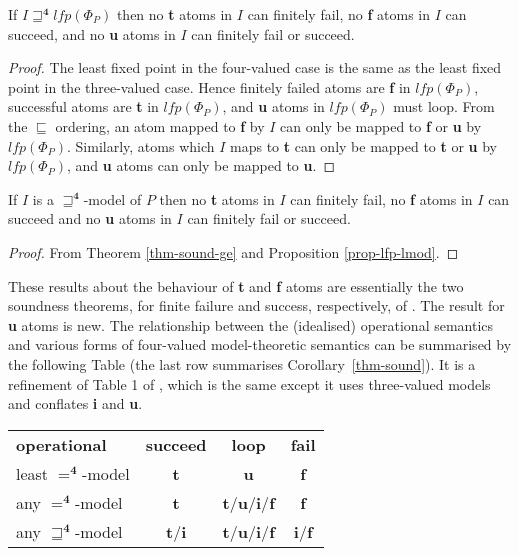 \documentclass{tlp}
\newcommand{\Quad}{\ensuremath{\mathbf{4}}}
\begin{document}
\begin{theorem} \rm
\label{thm-sound-ge}
If $I \sqsupseteq^\Quad lfp(\Phi_P)$ then no \textbf{t} atoms in $I$ can
finitely fail, no \textbf{f} atoms in $I$ can succeed, and no \textbf{u}
atoms in $I$ can finitely fail or succeed.  
\end{theorem}
\begin{proof}
The least fixed point in the four-valued case is the same as
the least fixed point in the three-valued case.
Hence \cite{Kunen87}
finitely failed atoms are \textbf{f} in $lfp(\Phi_P)$, 
successful atoms are \textbf{t} in $lfp(\Phi_P)$,
and \textbf{u} atoms in $lfp(\Phi_P)$ must loop.
From the $\sqsubseteq$ ordering, an atom mapped to \textbf{f} by $I$ 
can only be mapped to \textbf{f} or \textbf{u} by $lfp(\Phi_P)$.
Similarly, atoms which $I$ maps to \textbf{t} can only be 
mapped to \textbf{t} or \textbf{u} by $lfp(\Phi_P)$, and \textbf{u} 
atoms can only be mapped to \textbf{u}.
\end{proof}

\begin{corollary} \rm
\label{thm-sound}
If $I$ is a $\sqsupseteq^\Quad$-model of $P$ then no \textbf{t} atoms in $I$ can
finitely fail, no \textbf{f} atoms in $I$ can succeed and no \textbf{u}
atoms in $I$ can finitely fail or succeed.  
\end{corollary}
\begin{proof}
From Theorem \ref{thm-sound-ge} and Proposition \ref{prop-lfp-lmod}.
\end{proof}
These results about the behaviour of \textbf{t} and \textbf{f} atoms are
essentially the two soundness theorems, for finite failure and success,
respectively, of .  The result for \textbf{u} atoms is new.
The relationship between the (idealised) operational semantics and various
forms of four-valued model-theoretic semantics can be summarised by
the following Table (the last row summarises Corollary~\ref{thm-sound}).
It is a refinement of Table 1 of , which is the same except
it uses three-valued models and conflates \textbf{i} and \textbf{u}.
\medskip

\begin{center}
\begin{tabular}{|l|c|c|c|}
\cline{1-4}
\textbf{operational} & \textbf{succeed} & \textbf{loop} & \textbf{fail} \\
\cline{1-4}
least $=^\Quad$-model & \textbf{t} & \textbf{u} & \textbf{f} \\
\cline{1-4}
any $=^\Quad$-model & \textbf{t} &
		\textbf{t}/\textbf{u}/\textbf{i}/\textbf{f} & \textbf{f} \\
\cline{1-4}
any $\sqsupseteq^\Quad$-model & \textbf{t}/\textbf{i} &
		\textbf{t}/\textbf{u}/\textbf{i}/\textbf{f} & \textbf{i}/\textbf{f} \\
\cline{1-4}
\cline{1-4}
\end{tabular}
\end{center}
\end{document}
